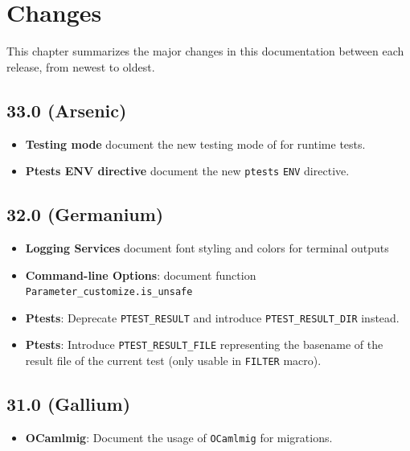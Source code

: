 
\chapter{Changes}\label{chap:changes}

This chapter summarizes the major changes in this documentation between each
\framac release, from newest to oldest.



\section*{33.0 (Arsenic)}

\begin{itemize}
  \item \textbf{Testing mode}
    document the new testing mode of \framac for runtime tests.
  \item \textbf{Ptests ENV directive}
    document the new \texttt{ptests} \texttt{ENV} directive.
\end{itemize}

\section*{32.0 (Germanium)}
\begin{itemize}
  \item \textbf{Logging Services}
    document font styling and colors for terminal outputs
  \item \textbf{Command-line Options}:
    document function \texttt{Parameter\_customize.is\_unsafe}
  \item \textbf{Ptests}: Deprecate \texttt{PTEST\_RESULT} and introduce
    \texttt{PTEST\_RESULT\_DIR} instead.
  \item \textbf{Ptests}: Introduce \texttt{PTEST\_RESULT\_FILE} representing the
    basename of the result file of the current test (only usable in
    \texttt{FILTER} macro).
\end{itemize}

\section*{31.0 (Gallium)}
\begin{itemize}
  \item \textbf{OCamlmig}: Document the usage of \texttt{OCamlmig} for
    migrations.
\end{itemize}

